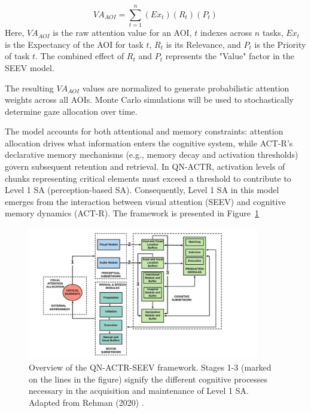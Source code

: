 \documentclass[12pt,a4paper]{article} %
\begin{document}
	\begin{equation}
		VA_{AOI} = \sum_{t=1}^{n} (Ex_t) (R_t) (P_t)
		\label{eq:VA_AOI}
		\end{equation}
	Here, $VA_{AOI}$ is the raw attention value for an AOI, $t$ indexes across $n$ tasks, $Ex_t$ is the Expectancy of the AOI for task $t$, $R_t$ is its Relevance, and $P_t$ is the Priority of task $t$. The combined effect of $R_t$ and $P_t$ represents the "Value" factor in the SEEV model.
	
	The resulting $VA_{AOI}$ values are normalized to generate probabilistic attention weights across all AOIs. Monte Carlo simulations will be used to stochastically determine gaze allocation over time.
	
	The model accounts for both attentional and memory constraints: attention allocation drives what information enters the cognitive system, while ACT-R's declarative memory mechanisms (e.g., memory decay and activation thresholds) govern subsequent retention and retrieval. In QN-ACTR, activation levels of chunks representing critical elements must exceed a threshold to contribute to Level 1 SA (perception-based SA). Consequently, Level 1 SA in this model emerges from the interaction between visual attention (SEEV) and cognitive memory dynamics (ACT-R). The framework is presented in Figure~\ref{fig:qn-actr-seev}

	\begin{figure}[h!]
    \centering
    \includegraphics[width=0.9\textwidth]{./images/qn-actr-sa-synoptic.png}
    \caption{Overview of the QN-ACTR-SEEV framework. Stages 1-3 (marked on the lines in the figure) signify the different cognitive processes necessary in the acquisition and maintenance of Level 1 SA. Adapted from Rehman (2020) \parencite{rehman_phd_thesis}.}
    \label{fig:qn-actr-seev}
	\end{figure}
\end{document}
